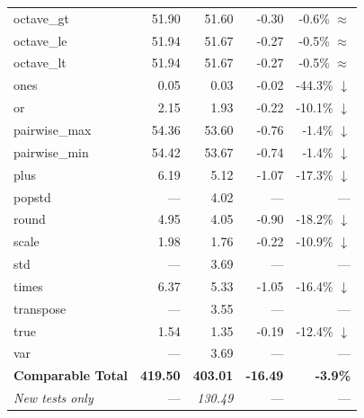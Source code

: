 \begin{table}[H]
\begin{tabular}{l r r r r}
  octave\_gt & 51.90 & 51.60 & -0.30 & -0.6\% $\approx$ \\
  octave\_le & 51.94 & 51.67 & -0.27 & -0.5\% $\approx$ \\
  octave\_lt & 51.94 & 51.67 & -0.27 & -0.5\% $\approx$ \\
  ones & 0.05 & 0.03 & -0.02 & -44.3\% $\downarrow$ \\
  or & 2.15 & 1.93 & -0.22 & -10.1\% $\downarrow$ \\
  pairwise\_max & 54.36 & 53.60 & -0.76 & -1.4\% $\downarrow$ \\
  pairwise\_min & 54.42 & 53.67 & -0.74 & -1.4\% $\downarrow$ \\
  plus & 6.19 & 5.12 & -1.07 & -17.3\% $\downarrow$ \\
  popstd & --- & 4.02 & --- & ---  \\
  round & 4.95 & 4.05 & -0.90 & -18.2\% $\downarrow$ \\
  scale & 1.98 & 1.76 & -0.22 & -10.9\% $\downarrow$ \\
  std & --- & 3.69 & --- & ---  \\
  times & 6.37 & 5.33 & -1.05 & -16.4\% $\downarrow$ \\
  transpose & --- & 3.55 & --- & ---  \\
  true & 1.54 & 1.35 & -0.19 & -12.4\% $\downarrow$ \\
  var & --- & 3.69 & --- & ---  \\
\midrule
  \textbf{Comparable Total} & \textbf{419.50} & \textbf{403.01} & \textbf{-16.49} & \textbf{-3.9\%} \\
  \textit{New tests only} & --- & \textit{130.49} & --- & --- \\
\bottomrule
\end{tabular}
\end{table}
